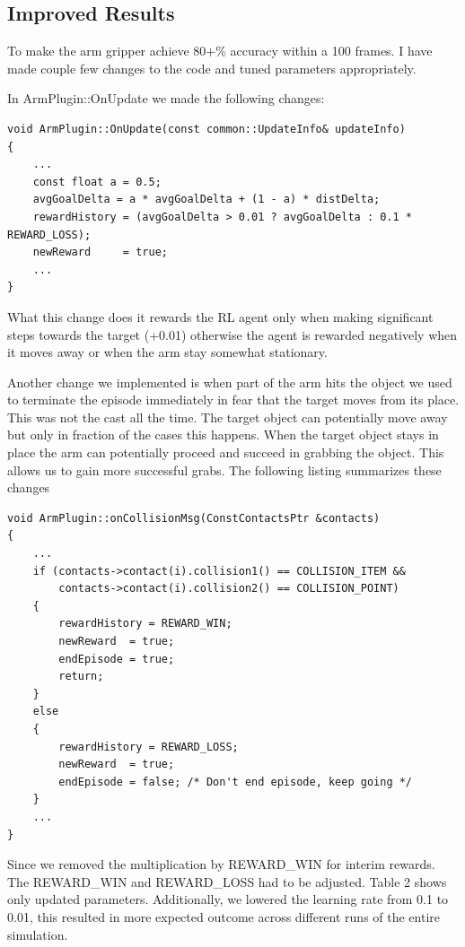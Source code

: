 \documentclass{article}
\begin{document}
\subsection{Improved Results}
To make the arm gripper achieve 80+\% accuracy within a 100 frames. I have made couple few changes to the code and tuned parameters appropriately.

In ArmPlugin::OnUpdate we made the following changes:
\begin{lstlisting}
void ArmPlugin::OnUpdate(const common::UpdateInfo& updateInfo)
{
    ...
    const float a = 0.5;
    avgGoalDelta = a * avgGoalDelta + (1 - a) * distDelta;
    rewardHistory = (avgGoalDelta > 0.01 ? avgGoalDelta : 0.1 * REWARD_LOSS);
    newReward     = true;
	...
}
\end{lstlisting}
What this change does it rewards the RL agent only when making significant steps towards the target (+0.01) otherwise the agent is rewarded negatively when it moves away or when the arm stay somewhat stationary.

Another change we implemented is when part of the arm hits the object we used to terminate the episode immediately in fear that the target moves from its place. This was not the cast all the time. The target object can potentially move away but only in fraction of the cases this happens. When the target object stays in place the arm can potentially proceed and succeed in grabbing the object. This allows us to gain more successful grabs. The following listing summarizes these changes

\begin{lstlisting}
void ArmPlugin::onCollisionMsg(ConstContactsPtr &contacts)
{
    ...
    if (contacts->contact(i).collision1() == COLLISION_ITEM &&
    	contacts->contact(i).collision2() == COLLISION_POINT)
    {
    	rewardHistory = REWARD_WIN;
    	newReward  = true;
    	endEpisode = true;
    	return;
    }
    else
    {
    	rewardHistory = REWARD_LOSS;
    	newReward  = true;
    	endEpisode = false; /* Don't end episode, keep going */
    }
    ...
}
\end{lstlisting}

Since we removed the multiplication by REWARD\_WIN for interim rewards. The REWARD\_WIN and REWARD\_LOSS had to be adjusted. Table 2 shows only updated parameters. Additionally, we lowered the learning rate from 0.1 to 0.01, this resulted in more expected outcome across different runs of the entire simulation.
\end{document}
